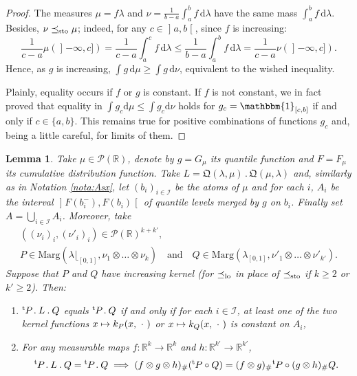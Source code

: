 \documentclass[10pt,a4paper]{article}
\newcommand{\ldot}{\mathbin{.}}
\newcommand\mto{\mathchoice{\longmapsto}{\mapsto}{\mapsto}{\mapsto}}
\theoremstyle{plain}
\newtheorem{lem}[them]{Lemma}
\theoremstyle{definition}
\newcommand{\dd}{\mathrm{d}}
\newcommand{\como}{\mathfrak{Q}}
\newcommand{\one}{\mathbbm{1}}
\newcommand{\trans}{{}^{\mathrm{t}}\mkern-1mu}
\newcommand{\la}{\lambda}
\newcommand{\p}{\mathcal{P}}
\newcommand{\ma}{\mathrm{Marg}}
\newcommand{\R}{\mathbb{R}}
\newcommand{\AND}{\quad\text{and}\quad}
\newcommand{\leqs}{\preceq_{\text{\rm sto}}}
\newcommand{\op}{\mathopen}
\newcommand{\clo}{\mathclose}
\newcommand{\leqlc}{\preceq_{\rm lo}}
\begin{document}
\begin{proof} The %
measures $\mu=f\la$ and $\nu=\frac1{b-a}\int_a^b f\,\dd\la$ have the same mass $\int_a^b f\,\dd\la$. Besides, $\nu\leqs\mu$; indeed, for any $c\in\op]a,b\clo[$, since $f$ is increasing:
\[\frac1{c-a}\mu(\op]-\infty,c])=\frac1{c-a}\int_{a}^c f\,\dd\la\leq\frac1{b-a}\int_{a}^b f\,\dd\la=\frac1{c-a}\nu(\op]-\infty,c]).\]
Hence, as $g$ is increasing, $\int g\,\dd\mu\geq\int g\,\dd\nu$, equivalent to the wished inequality.

Plainly, equality occurs if $f$ or $g$ is constant. If $f$ is not constant, we in fact proved that equality in $\int g_c \dd \mu\leq \int g_c \dd \nu$ holds for $g_c=\one_{[c,b]}$ if and only if $c\in\{a,b\}$. This remains true for positive combinations of functions $g_c$ and, being a little careful, for limits of them.
\end{proof}

\begin{lem}\label{lem:distributivite} Take $\mu\!\in\!\p(\R)$, denote by $g\!=\!G_\mu$ its quantile function and \hbox{$F\!=\!F_\mu$} its cumulative distribution function. Take $L=\como(\la,\mu)\ldot\como(\mu,\la)$ and, similarly as in Nota\-tion \ref{nota:Asx}, let $(b_i)_{i\in{\mathcal{I}}}$ be the atoms of $\mu$ and for each $i$, $A_i$ be the interval $\op]F(b_i^-),F(b_i)\clo[$ of quantile levels merged by $g$ on $b_i$. Finally set $A=\bigcup_{i\in\mathcal{I}}A_i$. Moreover, take\vspace*{-3pt}
\begin{gather*}
((\nu_i)_i,(\nu'_i)_i)\in\p(\R)^{k+k'},\\
P\in \ma(\la\lfloor_{[0,1]},\nu_1\otimes\ldots\otimes\nu_k)\AND Q\in\ma(\la_{[0,1]},\nu'_1\otimes\ldots\otimes\nu'_{k'}).
\end{gather*}
Suppose that $P$ and $Q$ have increasing kernel (for $\leqlc$ in place of $\leqs$ if $k\geq 2$ or $k'\geq2$). Then:
\begin{enumerate}
\item
\label{item:lem:distributiviteA} $\trans P\ldot L\ldot Q$ equals $\trans P\ldot Q$ if and only if for each $i\in{\mathcal I}$, at least one of the two kernel functions $x\mto k_P(x,\ \cdot\ )$ or $x\mto k_Q(x,\ \cdot\ )$ is constant on $A_i$,

\item
\label{item:lem:distributiviteB} For any measurable maps $f:\R^k\to\R^k$ and $h:\R^{k'}\to\R^{k'}$,
\[
\trans P\ldot L\ldot Q=\trans P\ldot Q\implies (f\otimes g \otimes h)_\#(\trans P\circ Q)=(f\otimes g)_\#\trans P\circ (g \otimes h)_\#Q.
\]
\end{enumerate}
\end{lem}
\end{document}
